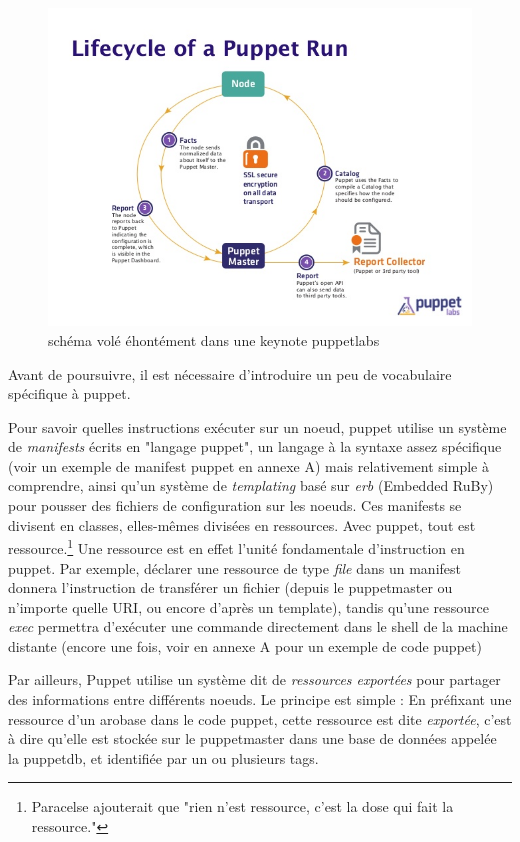 \documentclass[14 pt]{extreport}
\begin{document}
\begin{figure}[H]
\centering
\includegraphics[scale=0.70]{puppetrun.jpg}
\caption{schéma volé éhontément dans une keynote puppetlabs}
\label{}
\end{figure}

Avant de poursuivre, il est nécessaire d'introduire un peu de vocabulaire spécifique à puppet.

Pour savoir quelles instructions exécuter sur un noeud, puppet utilise un système de \emph{manifests} écrits en "langage puppet", un langage à la syntaxe assez spécifique (voir un exemple de manifest puppet en annexe A) mais relativement simple à comprendre, ainsi qu'un système de \emph{templating} basé sur \emph{erb} (Embedded RuBy) pour pousser des fichiers de configuration sur les noeuds. Ces manifests se divisent en classes, elles-mêmes divisées en ressources. Avec puppet, tout est ressource.\footnote{Paracelse ajouterait que "rien n'est ressource, c'est la dose qui fait la ressource."} Une ressource est en effet l'unité fondamentale d'instruction en puppet. Par exemple, déclarer une ressource de type \emph{file} dans un manifest donnera l'instruction de transférer un fichier (depuis le puppetmaster ou n'importe quelle URI, ou encore d'après un template), tandis qu'une ressource \emph{exec} permettra d'exécuter une commande directement dans le shell de la machine distante (encore une fois, voir en annexe A pour un exemple de code puppet)

Par ailleurs, Puppet utilise un système dit de \emph{ressources exportées} pour partager des informations entre différents noeuds. Le principe est simple : En préfixant une ressource d'un arobase dans le code puppet, cette ressource est dite \emph{exportée}, c'est à dire qu'elle est stockée sur le puppetmaster dans une base de données appelée la puppetdb, et identifiée par un ou plusieurs tags.
\end{document}
